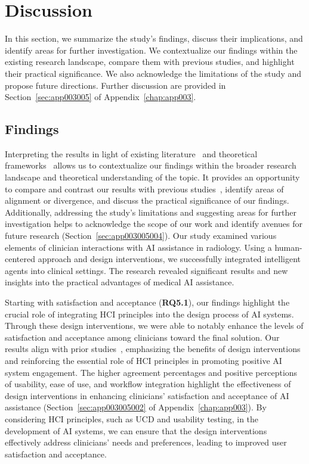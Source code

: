 \section{Discussion}
\label{sec:chap005007}

In this section, we summarize the study's findings, discuss their implications, and identify areas for further investigation.
We contextualize our findings within the existing research landscape, compare them with previous studies, and highlight their practical significance.
We also acknowledge the limitations of the study and propose future directions.
Further discussion are provided in Section~\ref{sec:app003005} of Appendix~\ref{chap:app003}.

\subsection{Findings}
\label{sec:chap005007001}

Interpreting the results in light of existing literature~\cite{10.1145/3411764.3445432} and theoretical frameworks~\cite{10.1145/3311957.3361858} allows us to contextualize our findings within the broader research landscape and theoretical understanding of the topic.
It provides an opportunity to compare and contrast our results with previous studies~\cite{CALISTO2022102285, CALISTO2021102607}, identify areas of alignment or divergence, and discuss the practical significance of our findings.
Additionally, addressing the study's limitations and suggesting areas for further investigation helps to acknowledge the scope of our work and identify avenues for future research (Section~\ref{sec:app003005004}).
Our study examined various elements of clinician interactions with \ac{AI} assistance in radiology.
Using a human-centered approach and design interventions, we successfully integrated intelligent agents into clinical settings.
The research revealed significant results and new insights into the practical advantages of medical \ac{AI} assistance.

Starting with satisfaction and acceptance ({\bf RQ5.1}), our findings highlight the crucial role of integrating \ac{HCI} principles into the design process of \ac{AI} systems.
Through these design interventions, we were able to notably enhance the levels of satisfaction and acceptance among clinicians toward the final solution.
Our results align with prior studies~\cite{10.1145/3411764.3445432}, emphasizing the benefits of design interventions and reinforcing the essential role of \ac{HCI} principles in promoting positive \ac{AI} system engagement.
The higher agreement percentages and positive perceptions of usability, ease of use, and workflow integration highlight the effectiveness of design interventions in enhancing clinicians' satisfaction and acceptance of \ac{AI} assistance (Section~\ref{sec:app003005002} of Appendix~\ref{chap:app003}).
By considering \ac{HCI} principles, such as \ac{UCD} and usability testing, in the development of \ac{AI} systems, we can ensure that the design interventions effectively address clinicians' needs and preferences, leading to improved user satisfaction and acceptance.

